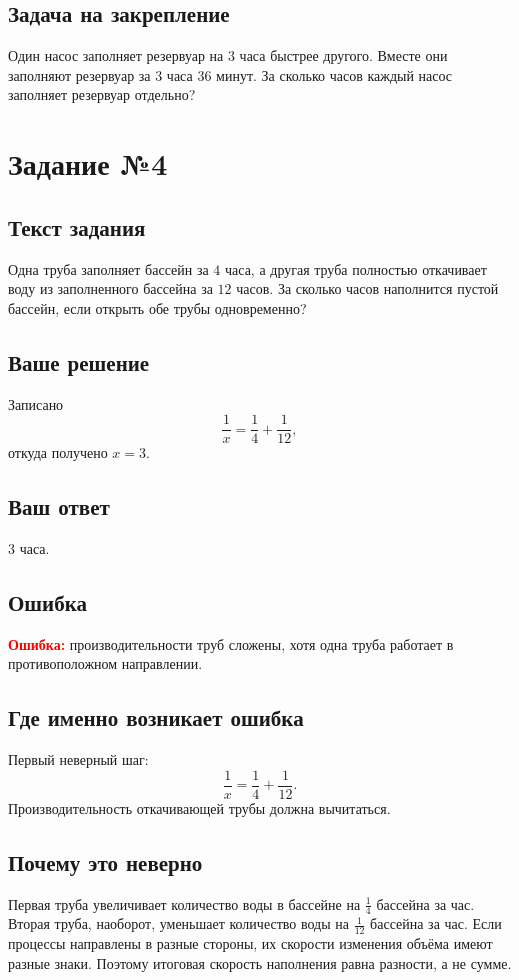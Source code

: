 \documentclass[12pt,a4paper]{article}
\newcommand{\err}{\textcolor{red}{\textbf{Ошибка:}}}
\newcommand{\tasksection}[1]{\section*{Задание №#1}}
\begin{document}
\subsection*{Задача на закрепление}
Один насос заполняет резервуар на $3$ часа быстрее другого. Вместе они заполняют резервуар за $3$ часа $36$ минут. За сколько часов каждый насос заполняет резервуар отдельно?

\newpage
{}\label{task:4}
\tasksection{4}
\subsection*{Текст задания}
Одна труба заполняет бассейн за $4$ часа, а другая труба полностью откачивает воду из заполненного бассейна за $12$ часов. За сколько часов наполнится пустой бассейн, если открыть обе трубы одновременно?

\subsection*{Ваше решение}
Записано
\[
\frac{1}{x}=\frac{1}{4}+\frac{1}{12},
\]
откуда получено $x=3$.

\subsection*{Ваш ответ}
$3$ часа.

\subsection*{Ошибка}
\err{} производительности труб сложены, хотя одна труба работает в противоположном направлении.

\subsection*{Где именно возникает ошибка}
Первый неверный шаг:
\[
\frac{1}{x}=\frac{1}{4}+\frac{1}{12}.
\]
Производительность откачивающей трубы должна вычитаться.

\subsection*{Почему это неверно}
Первая труба увеличивает количество воды в бассейне на $\frac14$ бассейна за час. Вторая труба, наоборот, уменьшает количество воды на $\frac1{12}$ бассейна за час. Если процессы направлены в разные стороны, их скорости изменения объёма имеют разные знаки. Поэтому итоговая скорость наполнения равна разности, а не сумме.
\end{document}
